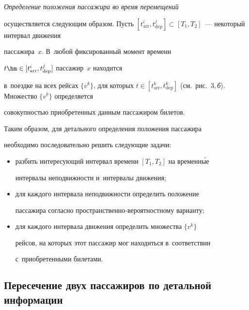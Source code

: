 \textit{Определение положения пассажира во время перемещений} 


осуществляется следующим образом. Пусть $[t^i_{\mathrm{arr}}, 


t^j_{\mathrm{dep}}] \subset [T_1, T_2]$~--- некоторый интервал движения 


пассажира~$x$. В~любой фиксированный момент времени  


$t\hm\in [t^i_{\mathrm{arr}}, t^j_{\mathrm{dep}}]$ пассажир~$x$ находится 


в~поездке на всех рейсах $\{v^k\}$, для которых $t\in [t^k_{\mathrm{arr}}, 


t^k_{\mathrm{dep}}]$ (см.\ рис.~3,\,\textit{б}). Множество $\{v^k\}$ определяется 


со\-во\-куп\-ностью приобретенных данным пассажиром билетов.





Таким образом, для детального определения положения пассажира 


необходимо последовательно решить следующие задачи:


\begin{itemize}


\item разбить интересующий интервал времени $[T_1, T_2]$ на временн\'{ы}е 


интервалы не\-под\-виж\-ности и~интервалы движения;


\item для каждого интервала неподвижности определить положение 


пассажира согласно про\-стран\-ст\-вен\-но-ве\-ро\-ят\-ност\-но\-му варианту;


\item для каждого интервала движения определить множества $\{v^k\}$ 


рей\-сов, на которых этот пассажир мог находиться в~соответствии 


с~приобретенными билетами.


\end{itemize}





\subsection{Пересечение двух пассажиров по детальной информации} %





